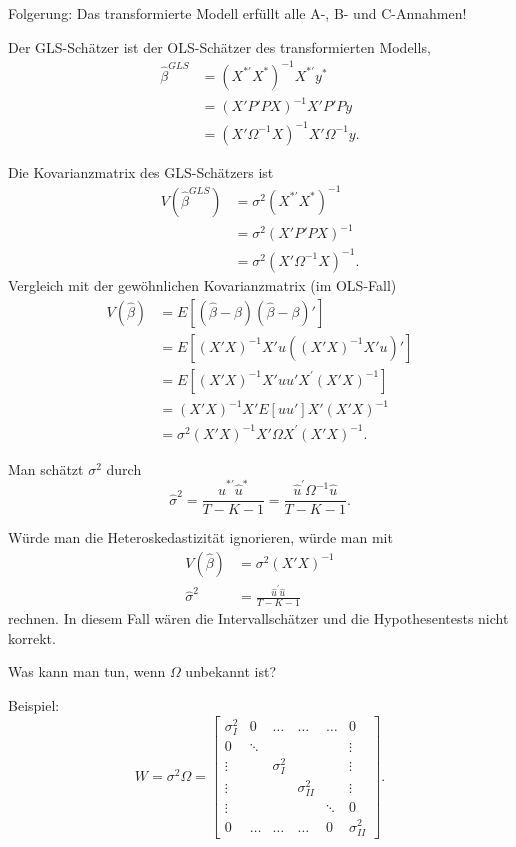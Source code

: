 \documentclass{article}
\begin{document}
Folgerung: Das transformierte Modell erfüllt alle A-, B- und C-Annahmen!

Der GLS-Schätzer ist der OLS-Schätzer des transformierten Modells,
\begin{align*}
\hat\beta^{GLS} &=(X^{\ast\prime }X^{\ast })^{-1}X^{\ast\prime }y^{\ast } \\
&=( X'P'PX) ^{-1}X'P'Py \\
&=( X'\Omega ^{-1}X) ^{-1}X'\Omega ^{-1}y.
\end{align*}

Die Kovarianzmatrix des GLS-Schätzers ist
\begin{align*}
V(\hat\beta^{GLS}) &=\sigma ^{2}(X^{\ast \prime }X^{\ast })^{-1} \\
&=\sigma^2\left( X'P'PX\right) ^{-1} \\
&=\sigma^2\left( X'\Omega ^{-1}X\right) ^{-1}.
\end{align*}
Vergleich mit der gewöhnlichen Kovarianzmatrix (im OLS-Fall)
\begin{align*}
V(\hat\beta) &= E\left[ \left( \hat\beta-\beta \right) \left( \hat\beta-\beta \right) '\right] \\
&=E\left[ \left( X'X\right) ^{-1}X'u\left( \left(X'X\right) ^{-1}X'u\right) '\right] \\
&=E\left[ \left( X'X\right) ^{-1}X'uu'X^{\prime}\left( X'X\right) ^{-1}\right] \\
&=\left( X'X\right) ^{-1}X'E\left[ uu'\right]X'\left( X'X\right) ^{-1} \\
&=\sigma ^{2}\left( X'X\right) ^{-1}X'\Omega X^{\prime}\left( X'X\right) ^{-1}.
\end{align*}

Man schätzt $\sigma ^{2}$ durch
\[ \hat{\sigma}^{2}=\frac{\hat{u}^{\ast \prime }\hat{u}^{\ast}}{T-K-1}
=\frac{\hat{u}^{\prime }\Omega^{-1}\hat{u}}{T-K-1}. \]

Würde man die Heteroskedastizität ignorieren, würde man mit
\begin{align*}
V(\hat{\beta}) &=\sigma ^{2}(X'X)^{-1} \\
\hat{\sigma}^{2} &=\frac{\hat{u}^{\prime }\hat{u}}{T-K-1}
\end{align*}
rechnen. In diesem Fall wären die Intervallschätzer und die Hypothesentests nicht
korrekt.

Was kann man tun, wenn $\Omega$ unbekannt ist?

Beispiel:
\[ W=\sigma ^{2}\Omega=\left[ 
\begin{array}{llllll}
\sigma _{I}^{2} & 0 & \ldots & \ldots & \ldots & 0 \\ 
0 & \ddots &  &  &  & \vdots \\ 
\vdots &  & \sigma _{I}^{2} &  &  & \vdots \\ 
\vdots &  &  & \sigma _{II}^{2} &  & \vdots \\ 
\vdots &  &  &  & \ddots & 0 \\ 
0 & \ldots & \ldots & \ldots & 0 & \sigma _{II}^{2}
\end{array} \right]. \]
\end{document}
